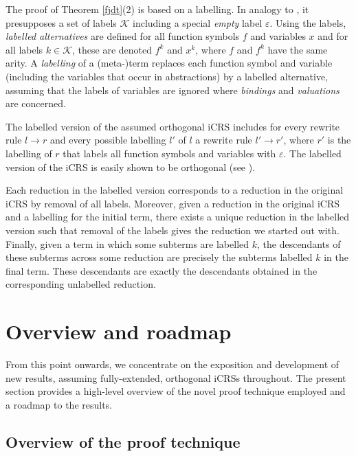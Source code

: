 \documentclass{LMCS}
\theoremstyle{definition}
\newcommand{\rew}{\rightarrow}
\begin{document}
\begin{rem}
\label{rem:label}
The proof of Theorem \ref{fjdt}(2) is based on a labelling. In analogy to \cite[Section II.2]{K80}, it presupposes a set of labels $\mathcal{K}$ including a special \emph{empty} label $\varepsilon$. Using the labels, \emph{labelled alternatives} are defined for all function symbols $f$ and variables $x$ and for all labels $k \in \mathcal{K}$, these are denoted $f^k$ and $x^k$, where $f$ and $f^k$ have the same arity. A \emph{labelling} of a (meta-)term replaces each function symbol and variable (including the variables that occur in abstractions) by a labelled alternative, assuming that the labels of variables are ignored where \emph{bindings} and \emph{valuations} are concerned.

The labelled version of the assumed orthogonal iCRS includes for every rewrite rule $l \rew r$ and every possible labelling $l'$ of $l$ a rewrite rule $l' \rew r'$, where $r'$ is the labelling of $r$ that labels all function symbols and variables with $\varepsilon$. The labelled version of the iCRS is easily shown to be orthogonal (see \cite[Proposition II.2.6]{K80}).

Each reduction in the labelled version corresponds to a reduction in the original iCRS by removal of all labels. Moreover, given a reduction in the original iCRS and a labelling for the initial term, there exists a unique reduction in the labelled version such that removal of the labels gives the reduction we started out with. Finally, given a term in which some subterms are labelled $k$, the descendants of these subterms across some reduction are precisely the subterms labelled $k$ in the final term. These descendants are exactly the descendants obtained in the corresponding unlabelled reduction.
\end{rem}

\section{Overview and roadmap}
\label{sec:overview}

From this point onwards, we concentrate on the exposition and development of new results, assuming fully-extended, orthogonal iCRSs throughout. The present section provides a high-level overview of the novel proof technique employed and a roadmap to the results.

\subsection{Overview of the proof technique}
\label{sec:overoverview}
\end{document}
